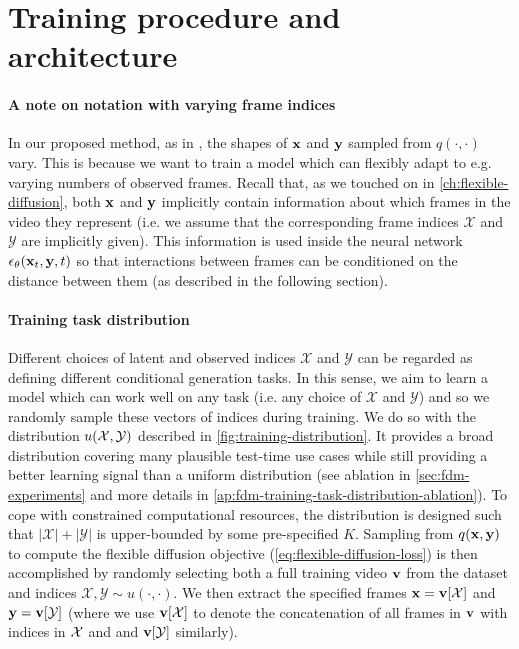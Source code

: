 \section{Training procedure and architecture}\label{sec:fdm-method}

\paragraph{A note on notation with varying frame indices}
In our proposed method, as in \citet{tashiro2021csdi}, the shapes of ${\mathbf{x}}$ and ${\mathbf{y}}$ sampled from $q(\cdot, \cdot)$ vary. This is because we want to train a model which can flexibly adapt to e.g. varying numbers of observed frames. Recall that, as we touched on in \cref{ch:flexible-diffusion}, both ${\mathbf{x}}$ and ${\mathbf{y}}$ implicitly contain information about which frames in the video they represent (i.e. we assume that the corresponding frame indices $\mathcal{X}$ and $\mathcal{Y}$ are implicitly given). This information is used inside the neural network $\epsilon_\theta({\mathbf{x}}_t,{\mathbf{y}}, t)$ so that interactions between frames can be conditioned on the distance between them (as described in the following section).

\paragraph{Training task distribution}
Different choices of latent and observed indices $\mathcal{X}$ and $\mathcal{Y}$ can be regarded as defining different conditional generation tasks. In this sense, we aim to learn a model which can work well on any task (i.e. any choice of $\mathcal{X}$ and $\mathcal{Y}$) and so we randomly sample these vectors of indices during training. We do so with the distribution $u(\mathcal{X},\mathcal{Y})$ described in \cref{fig:training-distribution}. It provides a broad distribution covering many plausible test-time use cases while still providing a better learning signal than a uniform distribution (see ablation in \cref{sec:fdm-experiments} and more details in \cref{ap:fdm-training-task-distribution-ablation}). To cope with constrained computational resources, the distribution is designed such that $|\mathcal{X}|+|\mathcal{Y}|$ is upper-bounded by some pre-specified $K$. Sampling from $q({\mathbf{x}}, {\mathbf{y}})$ to compute the flexible diffusion objective (\cref{eq:flexible-diffusion-loss}) is then accomplished by randomly selecting both a full training video ${\mathbf{v}}$ from the dataset and indices $\mathcal{X},\mathcal{Y}\sim u(\cdot,\cdot)$. We then extract the specified frames ${\mathbf{x}} = {\mathbf{v}}[\mathcal{X}]$ and ${\mathbf{y}} = {\mathbf{v}}[\mathcal{Y}]$ (where we use ${\mathbf{v}}[\mathcal{X}]$ to denote the concatenation of all frames in ${\mathbf{v}}$ with indices in $\mathcal{X}$ and and ${\mathbf{v}}[\mathcal{Y}]$ similarly).



